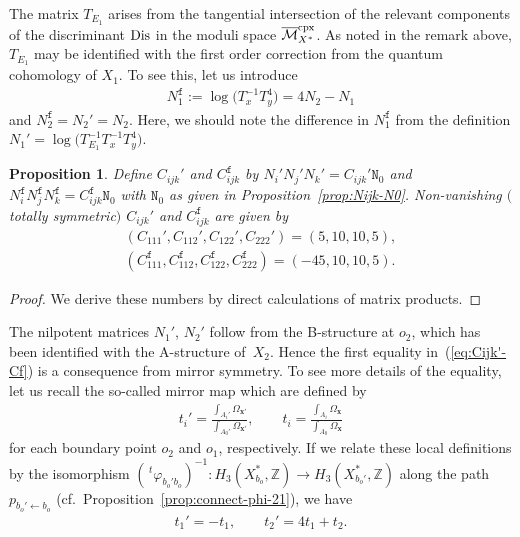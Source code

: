 \documentclass[pdftex]{sigma}
\numberwithin{equation}{section}
\newtheorem{Proposition}[Theorem]{Proposition}
\begin{document}
The matrix $T_{E_{1}}$ arises from the tangential intersection of the relevant components of the discriminant ${\rm Dis}$ in the moduli space $\overline{\mathcal{M}}_{X^{*}}^{\rm cpx}$. As noted in the remark above, $T_{E_{1}}$ may be identified with the first order correction from the quantum cohomology of $X_{1}$. To see this, let us introduce
\begin{gather}
N_{1}^{\mathtt{f}}:=\log\big(T_{x}^{-1}T_{y}^{4}\big)=4N_{2}-N_{1}\label{eq:N-Nf}
\end{gather}
and $N_{2}^{\mathtt{f}}=N_{2}'=N_{2}$. Here, we should note the difference in $N_{1}^{\mathtt{f}}$ from the definition $N_{1}'=\log\big(T_{E_{1}}^{-1}T_{x}^{-1}T_{y}^{4}\big)$.
\begin{Proposition}\label{prop: Cijk'-Cf-prop}Define $C_{ijk}'$ and $C_{ijk}^{\mathtt{f}}$ by $N_{i}'N_{j}'N_{k}'=C_{ijk}'\mathtt{N}_{0}$ and $N_{i}^{\mathtt{f}}N_{j}^{\mathtt{f}}N_{k}^{\mathtt{f}}=C_{ijk}^{\mathtt{f}}\mathtt{N}_{0}$ with $\mathtt{N}_{0}$ as given in Proposition~{\rm \ref{prop:Nijk-N0}}. Non-vanishing $($totally symmetric$)$ $C_{ijk}'$ and $C_{ijk}^{\mathtt{f}}$
are given by
\begin{gather}
(C_{111}',C_{112}',C_{122}',C_{222}')=(5,10,10,5),\nonumber\\
(C_{111}^{\mathtt{f}},C_{112}^{\mathtt{f}},C_{122}^{\mathtt{f}},C_{222}^{\mathtt{f}})=(-45,10,10,5).\label{eq:Cijk'-Cf}
\end{gather}
\end{Proposition}
\begin{proof}We derive these numbers by direct calculations of matrix products.
\end{proof}

The nilpotent matrices $N_{1}'$, $N_{2}'$ follow from the B-structure at $o_{2}$, which has been identified with the A-structure of~$X_{2}$. Hence the first equality in~(\ref{eq:Cijk'-Cf}) is a consequence from mirror symmetry. To see more details of the equality, let us recall the so-called mirror map which are defined by
\begin{gather}
t_{i}'=\frac{\int_{A_{i}'}\Omega_{\bm{x}'}}{\int_{A_{0}'}\Omega_{\bm{x}'}},\qquad t_{i}=\frac{\int_{A_{i}}\Omega_{\bm{x}}}{\int_{A_{0}}\Omega_{\bm{x}}}\label{eq:mirror-map}
\end{gather}
for each boundary point $o_{2}$ and $o_{1}$, respectively. If we relate these local definitions by the isomorphism $(\,^{t}\varphi_{b_{o}'b_{o}})^{-1}\colon H_{3}(X_{b_{o}}^{*},\mathbb{Z})\to H_{3}(X_{b_{o}'}^{*},\mathbb{Z})$ along the path $p_{b_{o}'\leftarrow b_{o}}$ (cf.\ Proposition~\ref{prop:connect-phi-21}), we have
\begin{gather*}
t_{1}'=-t_{1},\qquad t_{2}'=4t_{1}+t_{2}.
\end{gather*}
\end{document}
